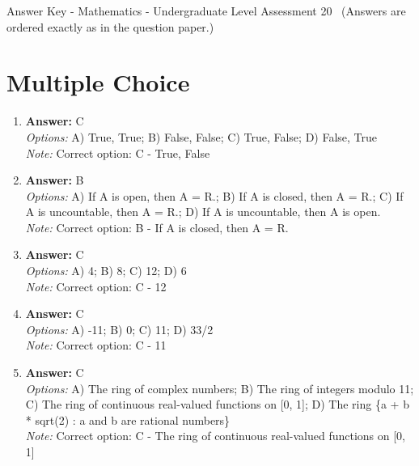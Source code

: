 \documentclass[12pt]{article}
\begin{document}
\begin{center}
Answer Key - Mathematics - Undergraduate Level Assessment 20 \
\small (Answers are ordered exactly as in the question paper.)
\end{center}

\section*{Multiple Choice}
\begin{enumerate}[label=\arabic*.]
\item \textbf{Answer:} C
\\ \textit{Options:} A) True, True; B) False, False; C) True, False; D) False, True
\\ \textit{Note:} Correct option: C - True, False
\item \textbf{Answer:} B
\\ \textit{Options:} A) If A is open, then A = R.; B) If A is closed, then A = R.; C) If A is uncountable, then A = R.; D) If A is uncountable, then A is open.
\\ \textit{Note:} Correct option: B - If A is closed, then A = R.
\item \textbf{Answer:} C
\\ \textit{Options:} A) 4; B) 8; C) 12; D) 6
\\ \textit{Note:} Correct option: C - 12
\item \textbf{Answer:} C
\\ \textit{Options:} A) -11; B) 0; C) 11; D) 33/2
\\ \textit{Note:} Correct option: C - 11
\item \textbf{Answer:} C
\\ \textit{Options:} A) The ring of complex numbers; B) The ring of integers modulo 11; C) The ring of continuous real-valued functions on [0, 1]; D) The ring \{a + b * sqrt(2) : a and b are rational numbers\}
\\ \textit{Note:} Correct option: C - The ring of continuous real-valued functions on [0, 1]
\end{enumerate}
\end{document}
